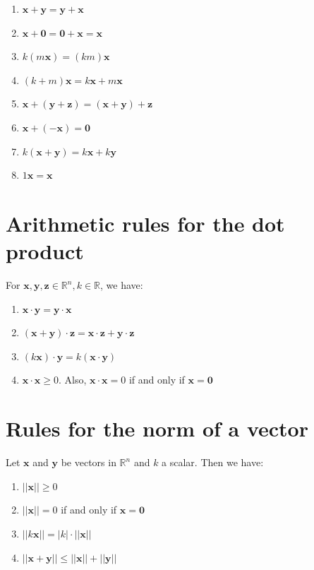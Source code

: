 \documentclass[11pt]{article}
\begin{document}
\begin{enumerate}
\item \(\boldsymbol{x} + \boldsymbol{y} = \boldsymbol{y} + \boldsymbol{x}\)
\item \(\boldsymbol{x} + \boldsymbol{0} = \boldsymbol{0} + \boldsymbol{x} = \boldsymbol{x}\)
\item \(k (m\boldsymbol{x}) = (km)\boldsymbol{x}\)
\item \((k + m)\boldsymbol{x} = k\boldsymbol{x} + m\boldsymbol{x}\)
\item \(\boldsymbol{x} + (\boldsymbol{y} + \boldsymbol{z}) = (\boldsymbol{x} + \boldsymbol{y}) + \boldsymbol{z}\)
\item \(\boldsymbol{x} + (- \boldsymbol{x}) = \boldsymbol{0}\)
\item \(k(\boldsymbol{x} + \boldsymbol{y}) = k\boldsymbol{x} + k\boldsymbol{y}\)
\item \(1\boldsymbol{x} = \boldsymbol{x}\)
\end{enumerate}


\section{Arithmetic rules for the dot product}
\label{sec:orgee3e70a}
For \(\boldsymbol{x}, \boldsymbol{y}, \boldsymbol{z} \in \mathbb{R}^n, k \in \mathbb{R}\), we have:
\begin{enumerate}
\item \(\boldsymbol{x} \cdot \boldsymbol{y} = \boldsymbol{y} \cdot \boldsymbol{x}\)
\item \((\boldsymbol{x} + \boldsymbol{y}) \cdot \boldsymbol{z} = \boldsymbol{x} \cdot \boldsymbol{z} + \boldsymbol{y} \cdot \boldsymbol{z}\)
\item \((k\boldsymbol{x}) \cdot \boldsymbol{y} = k(\boldsymbol{x} \cdot \boldsymbol{y})\)
\item \(\boldsymbol{x} \cdot \boldsymbol{x} \ge 0\). Also, \(\boldsymbol{x} \cdot \boldsymbol{x} = 0\) if and only if \(\boldsymbol{x} = \boldsymbol{0}\)
\end{enumerate}

\section{Rules for the norm of a vector}
\label{sec:org30a3f0a}
Let \(\boldsymbol{x}\) and \(\boldsymbol{y}\) be vectors in \(\mathbb{R}^n\) and \(k\) a scalar. Then we have:
\begin{enumerate}
\item \(|| \boldsymbol{x} || \ge 0\)
\item \(|| \boldsymbol{x} || = 0\) if and only if \(\boldsymbol{x} = \boldsymbol{0}\)
\item \(|| k \boldsymbol{x} || = |k| \cdot || \boldsymbol{x} ||\)
\item \(|| \boldsymbol{x} + \boldsymbol{y} || \le || \boldsymbol{x} || + || \boldsymbol{y} ||\)
\end{enumerate}
\end{document}
